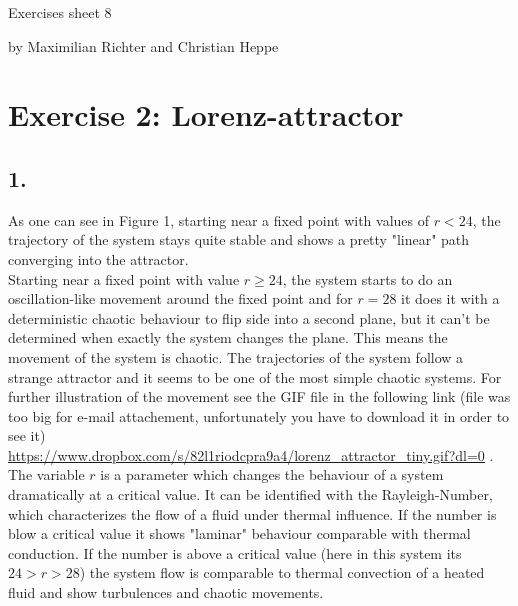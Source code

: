 \documentclass[12pt,a4paper]{article}
\begin{document}
\centerline{\large Exercises sheet 8}\vspace{0.5em}
\centerline{\large by Maximilian Richter and Christian Heppe}\vspace{2em}

\section*{Exercise 2: Lorenz-attractor}
\subsection*{1.}
As one can see in Figure 1, starting near a fixed point with values of $r<24$, the trajectory of the system stays quite stable and shows a pretty "linear" path converging into the attractor.\\
\newline
Starting near a fixed point with value $r\ge 24$, the system starts to do an oscillation-like movement around the fixed point and for $r=28$ it does it with a deterministic chaotic behaviour to flip side into a second plane, but it can't be determined when exactly the system changes the plane. This means the movement of the system is chaotic. The trajectories of the system follow a strange attractor and it seems to be one of the most simple chaotic systems. For further illustration of the movement see the GIF file in the following link (file was too big for e-mail attachement, unfortunately you have to download it in order to see it)\\
\url{https://www.dropbox.com/s/82l1riodcpra9a4/lorenz_attractor_tiny.gif?dl=0} .\\
\newline
The variable $r$ is a parameter which changes the behaviour of a system dramatically at a critical value. It can be identified with the Rayleigh-Number, which characterizes the flow of a fluid under thermal influence. If the number is blow a critical value it shows "laminar" behaviour comparable with thermal conduction. If the number is above a critical value (here in this system its $24>r>28$) the system flow is comparable to thermal convection of a heated fluid and show turbulences and chaotic movements. 
\end{document}
